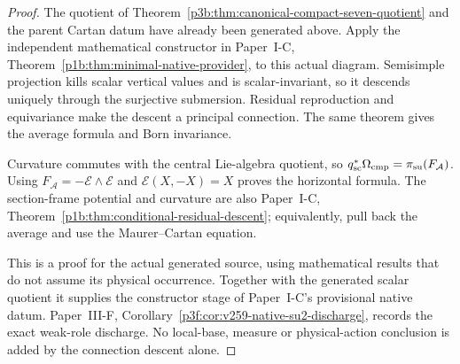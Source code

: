 \documentclass[12pt,a4paper]{article}
\begin{document}
\begin{proof}
The quotient of Theorem~\ref{p3b:thm:canonical-compact-seven-quotient}
and the parent Cartan datum have already been generated above.
Apply the independent mathematical constructor in Paper~I-C,
Theorem~\ref{p1b:thm:minimal-native-provider}, to this actual diagram.
Semisimple projection kills scalar vertical values and is scalar-invariant,
so it descends uniquely through the surjective submersion.  Residual
reproduction and equivariance make the descent a principal connection.
The same theorem gives the average formula and Born invariance.

Curvature commutes with the central Lie-algebra quotient, so
\(q_{\rm sc}^*\Omega_{\rm cmp}=\pi_{\rm su}(F_{\mathcal A})\).
Using \(F_{\mathcal A}=-\mathcal E\wedge\mathcal E\) and
\(\mathcal E(X,-X)=X\) proves the horizontal formula.  The section-frame
potential and curvature are also Paper~I-C,
Theorem~\ref{p1b:thm:conditional-residual-descent}; equivalently, pull
back the average and use the Maurer--Cartan equation.

This is a proof for the actual generated source, using mathematical results
that do not assume its physical occurrence.  Together with the generated
scalar quotient it supplies the constructor stage of Paper~I-C's
provisional native datum.  Paper~III-F,
Corollary~\ref{p3f:cor:v259-native-su2-discharge}, records the exact
weak-role discharge.  No local-base, measure or physical-action conclusion
is added by the connection descent alone.
\end{proof}
\end{document}
